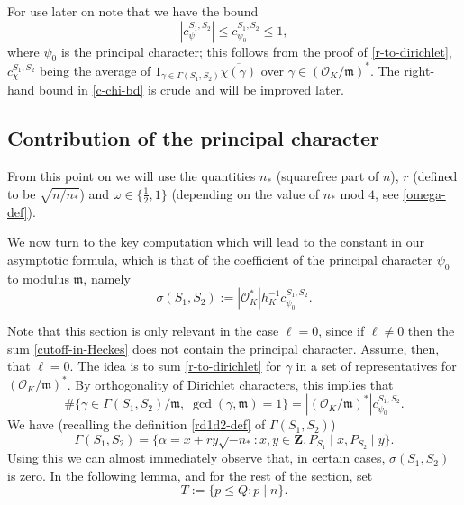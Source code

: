 \documentclass[11pt,reqno]{amsart}
\numberwithin{equation}{section}
\theoremstyle{definition}
\theoremstyle{remark}
\newcommand{\mf}{\mathfrak}
\renewcommand{\le}{\leqslant}
\newcommand\Z{\mathbf{Z}}
\renewcommand\O{\mathcal{O}}
\begin{document}
For use later on note that we have the bound
 \begin{equation}\label{c-chi-bd} |c^{S_1,S_2}_{\psi}| \le c^{S_1,S_2}_{\psi_0} \le 1 ,\end{equation} where $\psi_0$ is the principal character; this follows from the proof of \cref{r-to-dirichlet}, $c^{S_1,S_2}_{\chi}$ being the average of $1_{\gamma \in \Gamma(S_1, S_2)} \overline{\chi(\gamma)}$ over $\gamma \in (\O_K/\mf{m})^*$. The right-hand bound in \cref{c-chi-bd} is crude and will be improved later.



\subsection{Contribution of the principal character}\label{nstar-12}
From this point on we will use the quantities $n_*$ (squarefree part of $n$), $r$ (defined to be $\sqrt{n/n_*}$) and $\omega \in \{\frac{1}{2}, 1\}$ (depending on the value of $n_*$ mod $4$, see \cref{omega-def}).

We now turn to the key computation which will lead to the constant in our asymptotic formula, which is that of the coefficient of the principal character $\psi_0$ to modulus $\mf{m}$, namely
\begin{equation}\label{princ-char} \sigma(S_1, S_2) := |\O^*_K| h_K^{-1} c^{S_1,S_2}_{\psi_0}.\end{equation} 

Note that this section is only relevant in the case $\ell = 0$, since if $\ell \neq 0$ then the sum \cref{cutoff-in-Heckes} does not contain the principal character. Assume, then, that $\ell = 0$.
The idea is to sum \cref{r-to-dirichlet} for $\gamma$ in a set of representatives for $(\O_K/\mf{m})^*$. By orthogonality of Dirichlet characters, this implies that 
\begin{equation}\label{chi0-first} \# \{ \gamma \in \Gamma(S_1, S_2) /\mf{m} , \;\gcd(\gamma, \mf{m}) = 1 \} = |(\O_K/\mf{m})^*| c_{\psi_0}^{S_1,S_2}.\end{equation}
We have (recalling the definition \cref{rd1d2-def} of $\Gamma(S_1, S_2)$)
\begin{equation}\label{gamma-s1s2-again}  \Gamma(S_1, S_2)  = \{ \alpha = x + ry \sqrt{-n_*} : x, y \in \Z, P_{S_1} \mid x, P_{S_2} \mid y\} .\end{equation}
Using this we can almost immediately observe that, in certain cases, $\sigma(S_1, S_2)$ is zero.  In the following lemma, and for the rest of the section, set
\[ T := \{ p \le Q : p \mid n\}.\]
\end{document}
